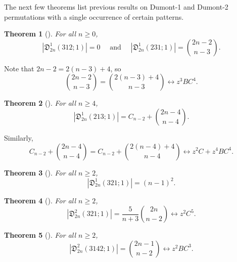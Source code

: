 \documentclass[
final
]{dmtcs-episciences}
\newtheorem{theorem}{Theorem}[section]%
\theoremstyle{definition}
\theoremstyle{remark}
\begin{document}
The next few theorems list previous results \cite{Burstein_Ofodile, Ofodile} on Dumont-1 and Dumont-2 permutations with a single occurrence of certain patterns.

\begin{theorem}[\cite {Ofodile}]
For all $n\ge 0$, 
\[
|\mathfrak{D}^1_{2n} (312;1)| = 0 \quad \text{ and } \quad |\mathfrak{D}^1_{2n} (231;1)| = \binom {2n-2} {n-3}.
\]
\end{theorem}

%

Note that 
$2n-2=2(n-3)+4$, so
\[
\binom {2n-2} {n-3} = \binom {2(n-3)+4} {n-3} \longleftrightarrow z^3BC^4.
\]

\begin{theorem}[\cite {Ofodile}]
For all $n\ge 4$,
\[
|\mathfrak{D}^1_{2n} (213;1)| = C_{n-2}+\binom {2n-4} {n-4}.
\]
\end{theorem}

Similarly,
\[
C_{n-2}+\binom {2n-4} {n-4} = C_{n-2}+\binom {2(n-4)+4} {n-4} \longleftrightarrow z^{2}C+z^4BC^4.
\]

\begin{theorem}[\cite{Burstein_Ofodile}]
For all $n \ge 2$,
\[
|\mathfrak{D}^1_{2n} (321;1)| = (n-1)^2.
\]
\end{theorem}

\begin{theorem}[\cite{Burstein_Ofodile}]
For all $n \ge 2$,
\[
|\mathfrak{D}^2_{2n} (321;1)| = \frac{5}{n+3}\binom{2n}{n-2} \longleftrightarrow z^2 C^5.
\]
\end{theorem}

\begin{theorem}[\cite {Ofodile}]
For all $n\ge 2$,
\[
|\mathfrak{D}^2_{2n} (3142;1)| = \binom {2n-1} {n-2} \longleftrightarrow z^2BC^3.
\]
\end{theorem}
\end{document}
